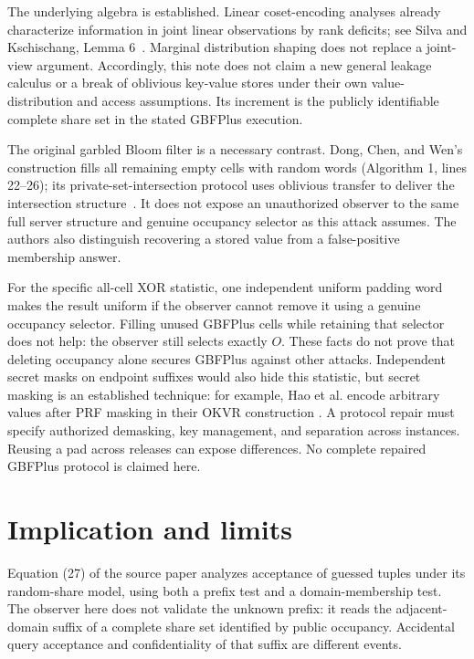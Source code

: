 \documentclass[11pt]{article}
\begin{document}
The underlying algebra is established. Linear coset-encoding analyses already
characterize information in joint linear observations by rank deficits; see
Silva and Kschischang, Lemma 6~\cite{silva2011universal}. Marginal distribution
shaping does not replace a joint-view argument. Accordingly, this note does not
claim a new general leakage calculus or a break of oblivious key-value stores
under their own value-distribution and access assumptions. Its increment is
the publicly identifiable complete share set in the stated GBFPlus execution.

The original garbled Bloom filter is a necessary contrast. Dong, Chen, and
Wen's construction fills all remaining empty cells with random words
(Algorithm 1, lines 22--26); its private-set-intersection protocol uses
oblivious transfer to deliver the intersection structure~\cite{dong2013gbf}.
It does not expose an unauthorized observer to the same full server structure
and genuine occupancy selector as this attack assumes. The authors also
distinguish recovering a stored value from a false-positive membership answer.

For the specific all-cell XOR statistic, one independent uniform padding word
makes the result uniform if the observer cannot remove it using a genuine
occupancy selector. Filling unused GBFPlus cells while retaining that selector
does not help: the observer still selects exactly $O$. These facts do not
prove that deleting occupancy alone secures GBFPlus against other attacks.
Independent secret masks on endpoint suffixes would also hide this statistic,
but secret masking is an established technique: for example, Hao et al.
encode arbitrary values after PRF masking in their OKVR construction
\cite{hao2024okvr}. A protocol repair must specify authorized demasking,
key management, and separation across instances. Reusing a pad across releases
can expose differences. No complete repaired GBFPlus protocol is claimed here.

\section{Implication and limits}

Equation (27) of the source paper analyzes acceptance of guessed tuples under
its random-share model, using both a prefix test and a domain-membership test.
The observer here
does not validate the unknown prefix: it reads the adjacent-domain suffix of
a complete share set identified by public occupancy. Accidental query acceptance
and confidentiality of that suffix are different events.
\end{document}
